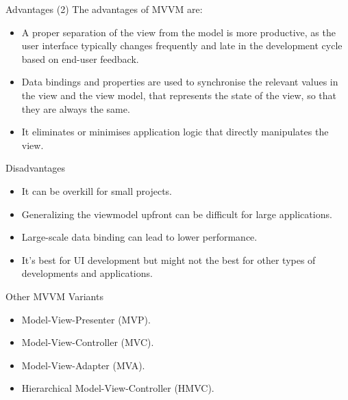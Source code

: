 \documentclass[aspectratio=169, table]{beamer}
\begin{document}
		\begin{frame}{Advantages (2)}
		The advantages of MVVM are:
		\begin{itemize}

			\item A proper separation of the view from the model is more productive, as the user interface typically changes frequently and late in the development cycle based on end-user feedback.
			\item Data bindings and properties are used to synchronise the relevant values in the view and the view model, that represents the state of the view, so that they are always the same.
			\item It eliminates or minimises application logic that directly manipulates the view.

		\end{itemize}
	\end{frame}

	\begin{frame}{Disadvantages}
		\begin{itemize}
			\item It can be overkill for small projects.
			\item Generalizing the viewmodel upfront can be difficult for large applications.
			\item Large-scale data binding can lead to lower performance.
			\item It's best for UI development but might not the best for other types of developments and  applications.
		\end{itemize}
	\end{frame}

	\begin{frame}{Other MVVM Variants}
		\begin{itemize}
			\item Model-View-Presenter (MVP).
			\item Model-View-Controller (MVC).
			\item Model-View-Adapter (MVA).
			\item Hierarchical Model-View-Controller (HMVC).

		\end{itemize}
	\end{frame}
\end{document}

